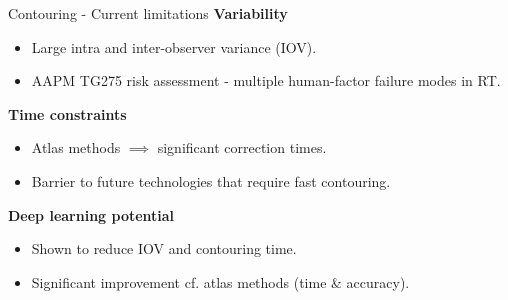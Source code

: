 \documentclass[9pt]{beamer}
\begin{document}
\begin{frame}{Contouring - Current limitations }
\textbf{Variability}
\begin{itemize}
\item Large intra and inter-observer variance (IOV).\footnotemark[1]
\item  AAPM TG275 risk assessment - multiple human-factor failure modes in RT.\footnotemark[2]
\end{itemize}
\vspace{4mm}

\textbf{Time constraints}
\begin{itemize}
	\item Atlas methods $\implies$ significant correction times.\footnotemark[3]
	\item Barrier to future technologies that require fast contouring.\footnotemark[3]
\end{itemize}
\vspace{4mm}

\textbf{Deep learning potential}
\begin{itemize}
	\item Shown to reduce IOV and contouring time.\footnotemark[3]
	\item Significant improvement cf. atlas methods (time \& accuracy).\footnotemark[4]
\end{itemize}
\end{frame}
%
\end{document}
